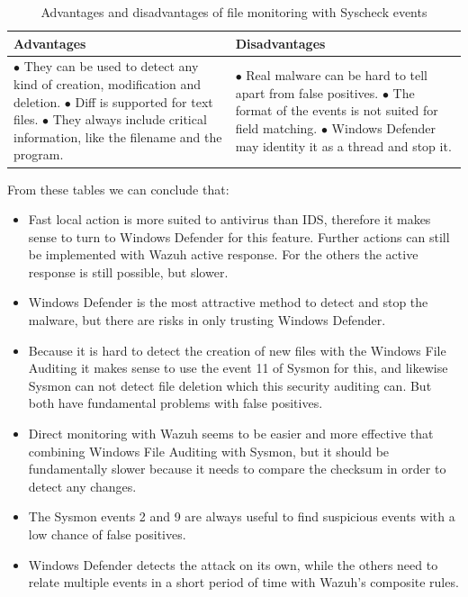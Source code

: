 \begin{table}[H]
	\begin{tabularx}{\textwidth}{|w|w|}
		\hline
		Advantages & Disadvantages\\ \hline
			$\bullet$ They can be used to detect any kind of creation, modification and deletion.
			\linej $\bullet$ Diff is supported for text files.
			\linej $\bullet$ They always include critical information, like the filename and the program.
		&
			$\bullet$ Real malware can be hard to tell apart from false positives.
			\linej $\bullet$ The format of the events is not suited for field matching.
			\linej $\bullet$ Windows Defender may identity it as a thread and stop it.
			\\ \hline
	\end{tabularx}
	\caption{Advantages and disadvantages of file monitoring with Syscheck events}
\end{table}
\linej
From these tables we can conclude that:
\begin{itemize}
	\item Fast local action is more suited to antivirus than IDS, therefore it makes sense to turn to Windows Defender for this feature. Further actions can still be implemented with Wazuh active response. For the others the active response is still possible, but slower.
	\item Windows Defender is the most attractive method to detect and stop the malware, but there are risks in only trusting Windows Defender.
	\item Because it is hard to detect the creation of new files with the Windows File Auditing it makes sense to use the event 11 of Sysmon for this, and likewise Sysmon can not detect file deletion which this security auditing can. But both have fundamental problems with false positives.
	\item Direct monitoring with Wazuh seems to be easier and more effective that combining Windows File Auditing with Sysmon, but it should be fundamentally slower because it needs to compare the checksum in order to detect any changes.
	\item The Sysmon events 2 and 9 are always useful to find suspicious events with a low chance of false positives.
	\item Windows Defender detects the attack on its own, while the others need to relate multiple events in a short period of time with Wazuh's composite rules.
\end{itemize}

